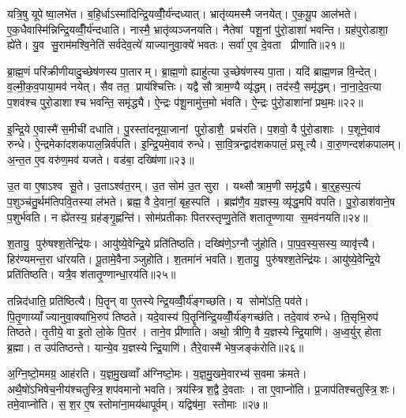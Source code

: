 यत्रि॒षु यूपेष्वा॒लभे॑त। ब॒हि॒र्धाऽस्मा॑दिन्द्रि॒यव्वीँ॒र्य॑न्दध्यात्। भ्रातृ॑व्यमस्मै जनयेत्। ए॒क॒यू॒प आल॑भते। ए॒क॒धैवास्मि॑न्निन्द्रि॒यव्वीँ॒र्य॑न्दधाति। नास्मै॒ भ्रातृ॑व्यञ्जनयति। नैतेषां पशू॒नां पु॑रो॒डाशा॑ भवन्ति। ग्रह॑पुरोडाशा॒ ह्ये॑ते। यु॒व सु॒राम॑मश्वि॒नेति॑ सर्वदेव॒त्ये॑ याज्यानुवा॒क्ये॑ भवतः। सर्वा॑ ए॒व दे॒वता प्रीणाति॥२१॥

ब्रा॒ह्म॒णं परि॑क्रीणीयादु॒च्छेष॑णस्य पा॒तारम्। ब्रा॒ह्म॒णो ह्याहु॑त्या उ॒च्छेष॑णस्य पा॒ता। यदि॑ ब्राह्म॒णन्न वि॒न्देत्। व॒ल्मी॒क॒व॒पाया॒मव॑ नयेत्। सैव तत॒ प्राय॑श्चित्तिः। यद्वै सौत्राम॒ण्यै व्यृ॑द्धम्। तद॑स्यै॒ समृ॑द्धम्। ना॒ना॒दे॒व॒त्या प॒शव॑श्च पुरो॒डाशाश्च भवन्ति॒ समृ॑द्ध्यै। ऐ॒न्द्रः प॑शू॒नामु॑त्त॒मो भ॑वति। ऐ॒न्द्रः पु॑रो॒डाशा॑नां प्रथ॒मः॥२२॥

इ॒न्द्रि॒ये ए॒वास्मै॑ स॒मीची॑ दधाति। पु॒रस्ता॑दनूया॒जानां पुरो॒डाशै॒ प्रच॑रति। प॒शवो॒ वै पु॑रो॒डाशाः। प॒शूने॒वाव॑ रुन्धे। ऐ॒न्द्रमेका॑दशकपाल॒न्निर्व॑पति। इ॒न्द्रि॒यमे॒वाव॑ रुन्धे। सा॒वि॒त्रन्द्वाद॑शकपालं॒ प्रसूत्यै। वा॒रु॒णन्दश॑कपालम्। अ॒न्त॒त ए॒व वरु॑ण॒मव॑ यजते। वड॑बा॒ दख्षि॑णा॥२३॥

उ॒त वा ए॒षाऽश्व सू॒ते। उ॒ताऽश्व॑त॒रम्। उ॒त सोम॑ उ॒त सुरा। यथ्सौत्राम॒णी समृ॑द्ध्यै। बा॒र्॒ह॒स्प॒त्यं प॒शुञ्च॑तु॒र्थम॑तिपवि॒तस्या ल॑भते। ब्रह्म॒ वै दे॒वानां॒ बृह॒स्पति॑। ब्रह्म॑णै॒व य॒ज्ञस्य॒ व्यृ॑द्ध॒मपि॑ वपति। पु॒रो॒डाश॑वाने॒ष प॒शुर्भ॑वति। न ह्ये॑तस्य॒ ग्रह॑ङ्गृ॒ह्णन्ति॑। सोम॑प्रतीकाः पितरस्तृप्णु॒तेति॑ शतातृ॒ण्णाया स॒मव॑नयति॥२४॥

श॒तायु॒ पुरु॑षश्श॒तेन्द्रि॑यः। आयु॑ष्ये॒वेन्द्रि॒ये प्रति॑तिष्ठति। दख्षि॑णे॒ऽग्नौ जु॑होति। पा॒प॒व॒स्य॒सस्य॒ व्यावृ॑त्त्यै। हिर॑ण्यमन्त॒रा धा॑रयति। पू॒तामे॒वैनाञ्जुहोति। श॒तमा॑नं भवति। श॒तायु॒ पुरु॑षश्श॒तेन्द्रि॑यः। आयु॑ष्ये॒वेन्द्रि॒ये प्रति॑तिष्ठति। यत्रै॒व श॑तातृ॒ण्णान्धा॒रय॑ति॥२५॥

तन्निद॑धाति॒ प्रति॑ष्ठित्यै। पि॒तॄन् वा ए॒तस्येन्द्रि॒यव्वीँ॒र्य॑ङ्गच्छति। य सोमो॑ऽति॒ पव॑ते। पि॒तृ॒णाय्याँज्यानुवा॒क्या॑भि॒रुप॑ तिष्ठते। यदे॒वास्य॑ पि॒तॄनि॑न्द्रि॒यव्वीँ॒र्य॑ङ्गच्छ॑ति। तदे॒वाव॑ रुन्धे। ति॒सृभि॒रुप॑ तिष्ठते। तृ॒तीये॒ वा इ॒तो लो॒के पि॒तर॑। ताने॒व प्री॑णाति। अथो॒ त्रीणि॒ वै य॒ज्ञस्येन्द्रि॒याणि॑। अ॒ध्व॒र्युर् होता ब्र॒ह्मा। त उप॑तिष्ठन्ते। यान्ये॒व य॒ज्ञस्येन्द्रि॒याणि॑। तैरे॒वास्मै॑ भेष॒जङ्क॑रोति॥२६॥\anuvakamend[प्री॒णा॒ति॒ प्र॒थ॒मो दख्षि॑णा स॒मव॑नयति धा॒रय॑तीन्द्रि॒याणि॑ च॒त्वारि॑ च]

अ॒ग्नि॒ष्टो॒ममग्र॒ आह॑रति। य॒ज्ञ॒मु॒खव्वाँ अ॑ग्निष्टो॒मः। य॒ज्ञ॒मु॒खमे॒वारभ्य॑ स॒वमा क्र॑मते। अथै॒षो॑ऽभिषेच॒नीय॑श्चतुस्त्रि॒शप॑वमानो भवति। त्रय॑स्त्रिश॒द्वै दे॒वताः। ता ए॒वाप्नो॑ति। प्र॒जाप॑तिश्चतुस्त्रि॒शः। तमे॒वाप्नो॑ति। स॒श॒र ए॒ष स्तोमा॑ना॒मय॑थापूर्वम्। यद्विष॑मा॒ स्तोमाः॥२७॥

